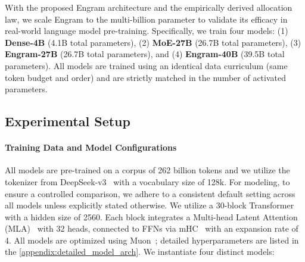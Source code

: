 With the proposed Engram architecture and the empirically derived allocation law, we scale Engram to the multi-billion parameter to validate its efficacy in real-world language model pre-training. Specifically, we train four models:
(1) \textbf{Dense-4B} (4.1B total parameters),
(2) \textbf{MoE-27B} (26.7B total parameters),
(3) \textbf{Engram-27B} (26.7B total parameters), and
(4) \textbf{Engram-40B} (39.5B total parameters).
All models are trained using an identical data curriculum (same token budget and order) and are strictly matched in the number of activated parameters.

\subsection{Experimental Setup}

\paragraph{Training Data and Model Configurations} All models are pre-trained on a corpus of 262 billion tokens and we utilize the tokenizer from DeepSeek-v3~\citep{liu2024deepseek} with a vocabulary size of 128k. For modeling, to ensure a controlled comparison, we adhere to a consistent default setting across all models unless explicitly stated otherwise. We utilize a 30-block Transformer with a hidden size of 2560. Each block integrates a Multi-head Latent Attention (MLA)~\citep{deepseekai2024deepseekv2strongeconomicalefficient} with 32 heads, connected to FFNs via mHC~\citep{xie2025mhcmanifoldconstrainedhyperconnections} with an expansion rate of 4. All models are optimized using Muon~\citep{jordan2024muon,team2025kimi}; detailed hyperparameters are listed in the \autoref{appendix:detailed_model_arch}. We instantiate four distinct models:

